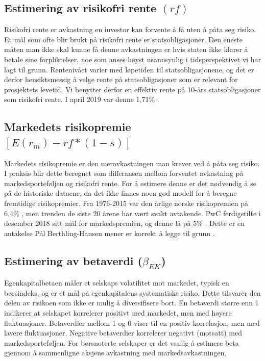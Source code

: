 \subsection{Estimering av risikofri rente \texorpdfstring{$(rf)$}{}}
Risikofri rente er avkastning en investor kan forvente å få uten å påta seg risiko. Et mål som ofte blir brukt på risikofri rente er statsobligasjoner. Den eneste måten man ikke skal kunne få denne avkastningen er hvis staten ikke klarer å betale sine forpliktelser, noe som anses høyst usannsynlig i tidsperspektivet vi har lagt til grunn. Rentenivået varier med løpetiden til statsobligasjonene, og det er derfor hensiktsmessig å velge rente på statsobligasjoner som er relevant for prosjektets levetid. Vi benytter derfor en effektiv rente på 10-års statsobligasjoner som risikofri rente. I april 2019 var denne 1,71\% \cite{statsobligasjoner}. 

\subsection{Markedets risikopremie \texorpdfstring{$[E(r_m) - rf *(1 - s)]$}{}}
Markedets risikopremie er den meravkastningen man krever ved å påta seg risiko. I praksis blir dette beregnet som differansen mellom forventet avkastning på markedsporteføljen og risikofri rente. For å estimere denne er det nødvendig å se på de historiske dataene, da det ikke finnes noen god modell for å beregne fremtidige risikopremier. Fra 1976-2015 var den årlige norske risikopremien på 6,4\% \cite{teori}, men trenden de siste 20 årene har vært svakt avtakende. PwC ferdigstilte i desember 2018 sitt mål for markedspremien, og denne lå på 5\% \cite{pwc}. Dette er en antakelse Pål Berthling-Hansen mener er korrekt å legge til grunn \cite{forelesningsnotater}.


\subsection{Estimering av betaverdi \texorpdfstring{($\beta_{EK}$)}{}}
Egenkapitalbetaen måler et selskaps volatilitet mot markedet, typisk en børsindeks, og er et mål på egenkapitalens systematiske risiko. Dette tilsvarer den delen av risikoen som ikke er mulig å diversifisere bort. En betaverdi større enn 1 indikerer at selskapet korrelerer positivt med markedet, men med høyere fluktuasjoner. Betaverdier mellom 1 og 0 viser til en positiv korrelasjon, men med lavere fluktuasjoner. Negative betaverdier korrelerer negativt (motsatt) med markedsporteføljen. For børsnoterte selskaper er det vanlig å estimere beta gjennom å sammenligne aksjens avkastning med markedsavkastningen. 

